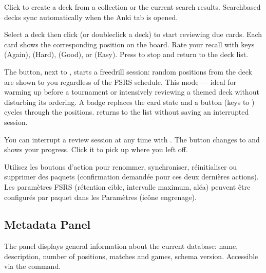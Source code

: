 \documentclass[letterpaper,10pt,english]{sphinxmanual}
\begin{document}
\sphinxAtStartPar
{} Click  to create a deck from a collection or the current search results. Search\sphinxhyphen{}based decks sync automatically when the Anki tab is opened.

\sphinxAtStartPar
{} Select a deck then click  (or double\sphinxhyphen{}click a deck) to start reviewing due cards. Each card shows the corresponding position on the board. Rate your recall with keys  (Again),  (Hard),  (Good), or  (Easy). Press  to stop and return to the deck list.

\sphinxAtStartPar
{} The  button, next to , starts a free\sphinxhyphen{}drill session: random positions from the deck are shown to you regardless of the FSRS schedule. This mode  — ideal for warming up before a tournament or intensively reviewing a themed deck without disturbing its ordering. A  badge replaces the card state and a  button (keys  to ) cycles through the positions.  returns to the list without saving an interrupted session.

\sphinxAtStartPar
{} You can interrupt a review session at any time with . The button changes to  and shows your progress. Click it to pick up where you left off.

\sphinxAtStartPar
{} Utilisez les boutons d’action pour renommer,
synchroniser, réinitialiser ou supprimer des paquets (confirmation demandée
pour ces deux dernières actions). Les paramètres FSRS (rétention cible,
intervalle maximum, aléa) peuvent être configurés par paquet dans les
Paramètres (icône engrenage).


\subsection{Metadata Panel}
\label{\detokenize{manuel:panneau-metadonnees}}\label{\detokenize{manuel:panneau-metadata}}
\sphinxAtStartPar
The  panel displays general information about the current database: name, description, number of positions, matches and games, schema version. Accessible via the  command.
\end{document}
